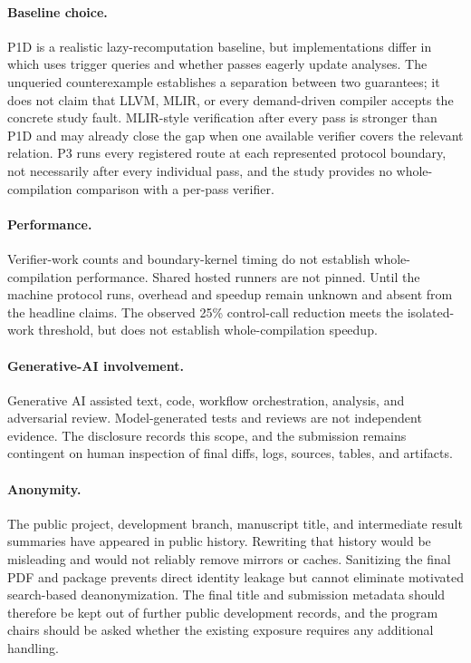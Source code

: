 \paragraph{Baseline choice.}
P1D is a realistic lazy-recomputation baseline, but implementations differ in which uses trigger queries and whether passes eagerly update analyses. The unqueried counterexample establishes a separation between two guarantees; it does not claim that LLVM, MLIR, or every demand-driven compiler accepts the concrete study fault. MLIR-style verification after every pass is stronger than P1D and may already close the gap when one available verifier covers the relevant relation. P3 runs every registered route at each represented protocol boundary, not necessarily after every individual pass, and the study provides no whole-compilation comparison with a per-pass verifier.

\paragraph{Performance.}
Verifier-work counts and boundary-kernel timing do not establish whole-compilation performance. Shared hosted runners are not pinned. Until the machine protocol runs, overhead and speedup remain unknown and absent from the headline claims.  The observed 25\% control-call reduction meets the isolated-work threshold, but does not establish whole-compilation speedup.

\paragraph{Generative-AI involvement.}
Generative AI assisted text, code, workflow orchestration, analysis, and adversarial review. Model-generated tests and reviews are not independent evidence. The disclosure records this scope, and the submission remains contingent on human inspection of final diffs, logs, sources, tables, and artifacts.

\paragraph{Anonymity.}
The public project, development branch, manuscript title, and intermediate result summaries have appeared in public history. Rewriting that history would be misleading and would not reliably remove mirrors or caches. Sanitizing the final PDF and package prevents direct identity leakage but cannot eliminate motivated search-based deanonymization. The final title and submission metadata should therefore be kept out of further public development records, and the program chairs should be asked whether the existing exposure requires any additional handling.
